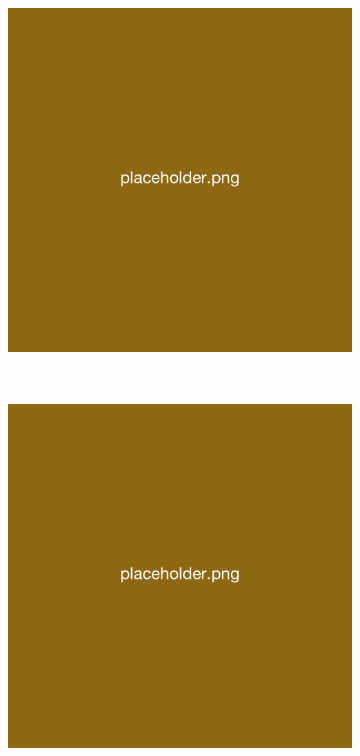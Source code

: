 \begin{figure}[H]
\begin{subfigure}[b]{0.25\textwidth}
    \end{subfigure}
    \hspace{10pt}
    \begin{subfigure}[b]{0.25\textwidth}
        \includegraphics[width=\linewidth]{overleaf/images/placeholder.png}
    \end{subfigure}
    \\
    \begin{subfigure}[b]{0.25\textwidth}
        \includegraphics[width=\linewidth]{overleaf/images/placeholder.png}

\end{subfigure}
\end{figure}
